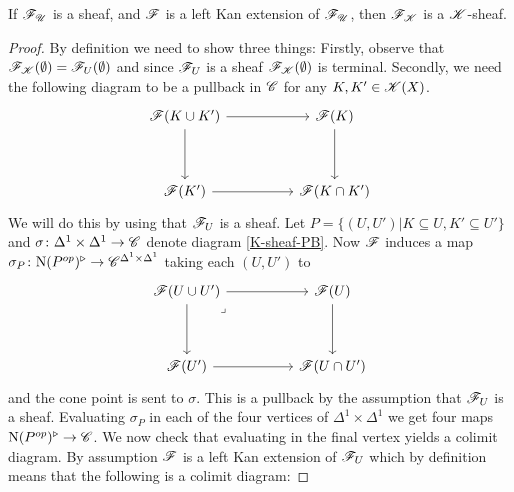 \documentclass[../../thesis.tex]{subfiles}
\begin{document}
\begin{lemma}
    If $\mathscr{F}_{\mathscr{U}}$ is a sheaf, and $\mathscr{F}$ is a left Kan extension of $\mathscr{F}_{\mathscr{U}}$, then $\mathscr{F}_{\mathscr{K}}$ is a $\mathscr{K}$-sheaf.
\end{lemma}
\begin{proof}
    By definition we need to show three things:
    Firstly, observe that $\mathscr{F}_{\mathscr{K}}(\emptyset) = \mathscr{F}_{U}(\emptyset)$ and since $\mathscr{F}_{U}$ is a sheaf $\mathscr{F}_{\mathscr{K}}(\emptyset)$ is terminal.
    Secondly, we need the following diagram to be a pullback in $\mathscr{C}$ for any $K,K' \in \mathscr{K}(X)$.
    \begin{equation}\label{K-sheaf-PB}
        \begin{tikzcd}
            {\F(K \cup K')} && {\F(K)} \\
            \\
            {\F(K')} && {\F(K\cap K')}
            \arrow[from=1-3, to=3-3]
            \arrow[from=3-1, to=3-3]
            \arrow[from=1-1, to=3-1]
            \arrow[from=1-1, to=1-3]
        \end{tikzcd}
    \end{equation}
    We will do this by using that $\mathscr{F}_{U}$ is a sheaf.
    Let $P = \{(U,U') | K \subseteq U, K' \subseteq U'\}$ and $\sigma\colon \Delta^1\times\Delta^1 \to \mathscr{C}$ denote diagram \ref{K-sheaf-PB}.
    Now $\mathscr{F}$ induces a map $\sigma_P\colon \mathrm{N}(P^{op})^{\triangleright} \to \mathscr{C}^{\Delta^1\times\Delta^1}$ taking each $(U, U')$ to
    \[
        \begin{tikzcd}
            {\F(U \cup U')} && {\F(U)} \\
            \\
            {\F(U')} && {\F(U\cap U')}
            \arrow[from=1-3, to=3-3]
            \arrow[from=3-1, to=3-3]
            \arrow[from=1-1, to=3-1]
            \arrow["\lrcorner"{anchor=center, pos=0.125}, draw=none, from=1-1, to=3-3]
            \arrow[from=1-1, to=1-3]
        \end{tikzcd}
    \]
    and the cone point is sent to $\sigma$. This is a pullback by the assumption that $\mathscr{F}_{U}$ is a sheaf.
    Evaluating $\sigma_P$ in each of the four vertices of $\Delta^1 \times \Delta^1$ we get four maps $\mathrm{N}(P^{op})^{\triangleright} \to \mathscr{C}$.
    We now check that evaluating in the final vertex yields a colimit diagram.
    By assumption $\mathscr{F}$ is a left Kan extension of $\mathscr{F}_{U}$ which by definition means that the following is a colimit diagram:

\end{proof}
\end{document}
